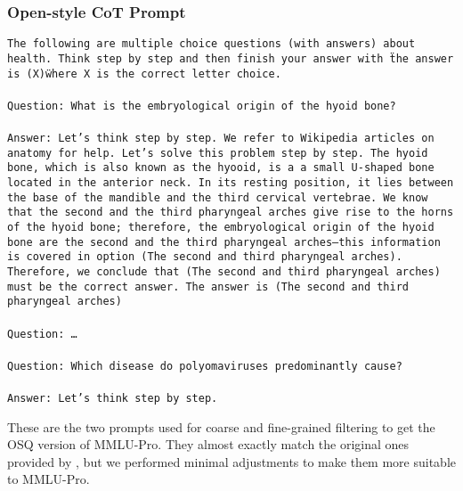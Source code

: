 \subsubsection{Open-style CoT Prompt}\label{prompt:cot_osq}
\begin{tcolorbox}[colback=white, colframe=black, title=Few-shot CoT OSQ Prompt]
\texttt{The following are multiple choice questions (with answers) about health. Think step by step and then finish your answer with \"the answer is (X)\" where X is the correct letter choice. \\ \\
Question: What is the embryological origin of the hyoid bone?\\ \\
Answer: Let's think step by step. We refer to Wikipedia articles on anatomy for help. Let’s solve this problem step by step. The hyoid bone, which is also known as the hyooid, is a a small U-shaped bone located in the anterior neck. In its resting position, it lies between the base of the mandible and the third cervical vertebrae. We know that the second and the third pharyngeal arches give rise to the horns of the hyoid bone; therefore, the embryological origin of the hyoid bone are the second and the third pharyngeal arches—this information is covered in option (The second and third pharyngeal arches). Therefore, we conclude that (The second and third pharyngeal arches) must be the correct answer. The answer is (The second and third pharyngeal arches) \\ \\
Question: \dots \\ \\
Question: Which disease do polyomaviruses predominantly cause?  \\ \\
Answer: Let's think step by step.}
\end{tcolorbox}

These are the two prompts used for coarse and fine-grained filtering to get the OSQ version of MMLU-Pro. They almost exactly match the original ones provided by \citet{myrzakhan2024openllmleaderboard}, but we performed minimal adjustments to make them more suitable to MMLU-Pro.


